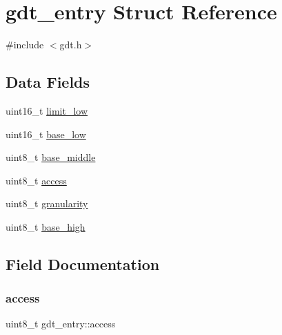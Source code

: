\hypertarget{structgdt__entry}{}\section{gdt\+\_\+entry Struct Reference}
\label{structgdt__entry}


{\ttfamily \#include $<$gdt.\+h$>$}

\subsection*{Data Fields}
\begin{DoxyCompactItemize}
\item 
uint16\+\_\+t \hyperlink{structgdt__entry_ad1cb239b48c0bfb34a017d5deb87e3ff}{limit\+\_\+low}
\item 
uint16\+\_\+t \hyperlink{structgdt__entry_ade3b4a3948e6e475221de4e226f8579c}{base\+\_\+low}
\item 
uint8\+\_\+t \hyperlink{structgdt__entry_ab5c8ccda9d0651184c31089ce7bbdbae}{base\+\_\+middle}
\item 
uint8\+\_\+t \hyperlink{structgdt__entry_af8f88469b3301c3e777e97b470a97413}{access}
\item 
uint8\+\_\+t \hyperlink{structgdt__entry_accb2a2ef318b0e4fbe2016eb8097947d}{granularity}
\item 
uint8\+\_\+t \hyperlink{structgdt__entry_a96abeddea82dd23ff9e84d09230e31a2}{base\+\_\+high}
\end{DoxyCompactItemize}


\subsection{Field Documentation}
\mbox{\label{structgdt__entry_af8f88469b3301c3e777e97b470a97413}} 
\subsubsection{\texorpdfstring{access}{access}}
{\footnotesize\ttfamily uint8\+\_\+t gdt\+\_\+entry\+::access}

\mbox{\label{structgdt__entry_a96abeddea82dd23ff9e84d09230e31a2}} 
